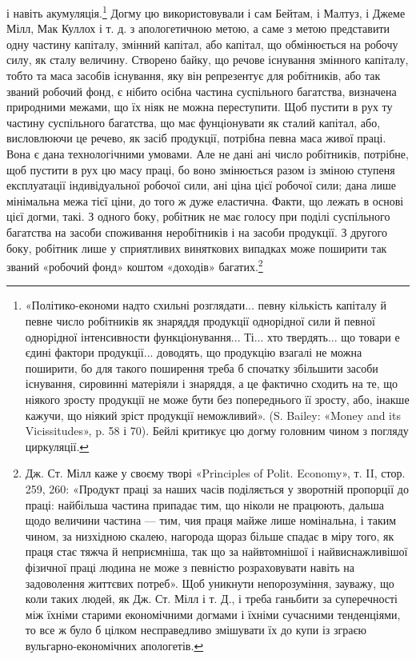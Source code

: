 \parcont{}  %
і навіть акумуляція.\footnote{
«Політико-економи надто схильні розглядати... певну кількість
капіталу й певне число робітників як знаряддя продукції однорідної
сили й певної однорідної інтенсивности функціонування... Ті... хто твердять...
що товари е єдині фактори продукції... доводять, що продукцію
взагалі не можна поширити, бо для такого поширення треба б спочатку
збільшити засоби існування, сировинні матеріяли і знаряддя, а це фактично
сходить на те, що ніякого зросту продукції не може бути без попереднього
її зросту, або, інакше кажучи, що ніякий зріст продукції неможливий».
(S. Bailey: «Money and its Vicissitudes», p. 58 і 70). Бейлі
критикує цю догму головним чином з погляду циркуляції.
} Догму цю використовували і сам Бейтам,
і Малтуз, і Джеме Мілл, Мак Куллох і т. д. з апологетичною
метою, а саме з метою представити одну частину капіталу, змінний
капітал, або капітал, що обмінюється на робочу силу, як
сталу величину. Створено байку, що речове існування змінного
капіталу, тобто та маса засобів існування, яку він репрезентує
для робітників, або так званий робочий фонд, є нібито осібна
частина суспільного багатства, визначена природними межами,
що їх ніяк не можна переступити. Щоб пустити в рух ту частину
суспільного багатства, що має фунціонувати як сталий капітал,
або, висловлюючи це речево, як засіб продукції, потрібна
певна маса живої праці. Вона є дана технологічними умовами. Але
не дані ані число робітників, потрібне, щоб пустити в рух цю
масу праці, бо воно змінюється разом із зміною ступеня експлуатації
індивідуальної робочої сили, ані ціна цієї робочої сили;
дана лише мінімальна межа тієї ціни, до того ж дуже еластична.
Факти, що лежать в основі цієї догми, такі. З одного боку, робітник
не має голосу при поділі суспільного багатства на засоби
споживання неробітників і на засоби продукції. З другого
боку, робітник лише у сприятливих виняткових випадках може
поширити так званий «робочий фонд» коштом «доходів» багатих.\footnote{
Дж. Ст. Мілл каже у своєму творі «Principles of Polit. Economy»,
т. II, стор. 259, 260: «Продукт праці за наших часів поділяється у зворотній
пропорції до праці: найбільша частина припадає тим, що ніколи
не працюють, дальша щодо величини частина — тим, чия праця майже
лише номінальна, і таким чином, за низхідною скалею, нагорода щораз
більше спадає в міру того, як праця стає тяжча й неприємніша, так що
за найвтомнішої і найвиснажливішої фізичної праці людина не може з
певністю розраховувати навіть на задоволення життєвих потреб». Щоб
уникнути непорозуміння, зауважу, що коли таких людей, як Дж. Ст.
Мілл і т. Д., і треба ганьбити за суперечності між їхніми старими економічними
догмами і їхніми сучасними тенденціями, то все ж було б цілком
несправедливо змішувати їх до купи із зграєю вульгарно-економічних
апологетів.
}
